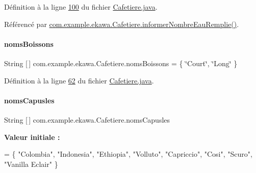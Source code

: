 Définition à la ligne \hyperlink{_cafetiere_8java_source_l00100}{100} du fichier \hyperlink{_cafetiere_8java_source}{Cafetiere.\+java}.



Référencé par \hyperlink{_cafetiere_8java_source_l00368}{com.\+example.\+ekawa.\+Cafetiere.\+informer\+Nombre\+Eau\+Remplie()}.

\mbox{\label{classcom_1_1example_1_1ekawa_1_1_cafetiere_a59db420b33a9f03aad97d6cad4f87c03}} 
\paragraph{\texorpdfstring{noms\+Boissons}{nomsBoissons}}
{\footnotesize\ttfamily String \mbox{[}$\,$\mbox{]} com.\+example.\+ekawa.\+Cafetiere.\+noms\+Boissons = \{ \char`\"{}Court\char`\"{}, \char`\"{}Long\char`\"{} \}\hspace{0.3cm}{\ttfamily [private]}}



Définition à la ligne \hyperlink{_cafetiere_8java_source_l00062}{62} du fichier \hyperlink{_cafetiere_8java_source}{Cafetiere.\+java}.

\mbox{\label{classcom_1_1example_1_1ekawa_1_1_cafetiere_a127a27c8f3b4c6c5dc4bfb639f654b3d}} 
\paragraph{\texorpdfstring{noms\+Capusles}{nomsCapusles}}
{\footnotesize\ttfamily String \mbox{[}$\,$\mbox{]} com.\+example.\+ekawa.\+Cafetiere.\+noms\+Capusles\hspace{0.3cm}{\ttfamily [private]}}

{\bfseries Valeur initiale \+:}
\begin{DoxyCode}
= \{
            \textcolor{stringliteral}{"Colombia"},
            \textcolor{stringliteral}{"Indonesia"},
            \textcolor{stringliteral}{"Ethiopia"},
            \textcolor{stringliteral}{"Volluto"},
            \textcolor{stringliteral}{"Capriccio"},
            \textcolor{stringliteral}{"Cosi"},
            \textcolor{stringliteral}{"Scuro"},
            \textcolor{stringliteral}{"Vanilla Eclair"}
    \}
\end{DoxyCode}


